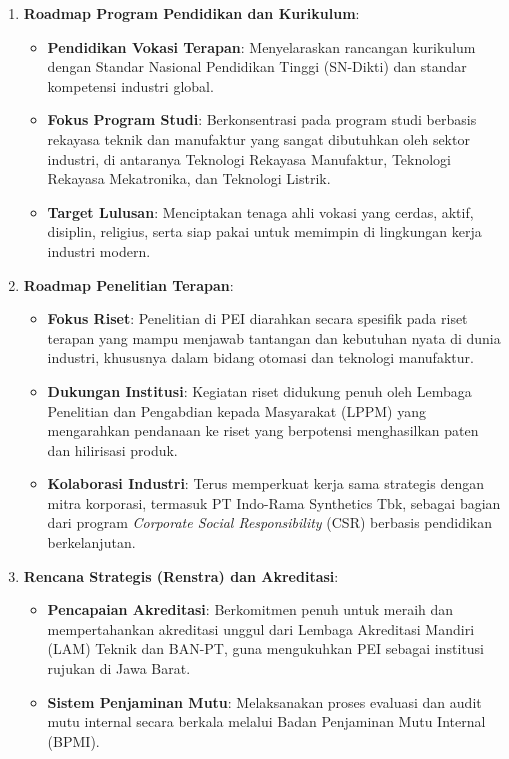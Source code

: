 \begin{enumerate}[label=\arabic*.]
    \item \textbf{Roadmap Program Pendidikan dan Kurikulum}:
    \begin{itemize}
        \item \textbf{Pendidikan Vokasi Terapan}: Menyelaraskan rancangan kurikulum dengan Standar Nasional Pendidikan Tinggi (SN-Dikti) dan standar kompetensi industri global.
        \item \textbf{Fokus Program Studi}: Berkonsentrasi pada program studi berbasis rekayasa teknik dan manufaktur yang sangat dibutuhkan oleh sektor industri, di antaranya Teknologi Rekayasa Manufaktur, Teknologi Rekayasa Mekatronika, dan Teknologi Listrik.
        \item \textbf{Target Lulusan}: Menciptakan tenaga ahli vokasi yang cerdas, aktif, disiplin, religius, serta siap pakai untuk memimpin di lingkungan kerja industri modern.
    \end{itemize}
    
    \item \textbf{Roadmap Penelitian Terapan}:
    \begin{itemize}
        \item \textbf{Fokus Riset}: Penelitian di PEI diarahkan secara spesifik pada riset terapan yang mampu menjawab tantangan dan kebutuhan nyata di dunia industri, khususnya dalam bidang otomasi dan teknologi manufaktur.
        \item \textbf{Dukungan Institusi}: Kegiatan riset didukung penuh oleh Lembaga Penelitian dan Pengabdian kepada Masyarakat (LPPM) yang mengarahkan pendanaan ke riset yang berpotensi menghasilkan paten dan hilirisasi produk.
        \item \textbf{Kolaborasi Industri}: Terus memperkuat kerja sama strategis dengan mitra korporasi, termasuk PT Indo-Rama Synthetics Tbk, sebagai bagian dari program \textit{Corporate Social Responsibility} (CSR) berbasis pendidikan berkelanjutan.
    \end{itemize}
    
    \item \textbf{Rencana Strategis (Renstra) dan Akreditasi}:
    \begin{itemize}
        \item \textbf{Pencapaian Akreditasi}: Berkomitmen penuh untuk meraih dan mempertahankan akreditasi unggul dari Lembaga Akreditasi Mandiri (LAM) Teknik dan BAN-PT, guna mengukuhkan PEI sebagai institusi rujukan di Jawa Barat.
        \item \textbf{Sistem Penjaminan Mutu}: Melaksanakan proses evaluasi dan audit mutu internal secara berkala melalui Badan Penjaminan Mutu Internal (BPMI).
    \end{itemize}
\end{enumerate}
